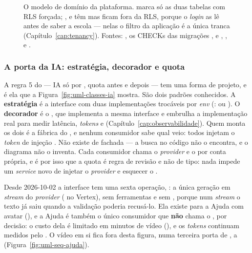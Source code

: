 \begin{figure}[H]
{\begin{tikzpicture}[x=1cm, y=1cm]
\end{tikzpicture}}
\caption[Classes: o modelo de domínio da plataforma]{O modelo de domínio da
  plataforma.  marca só as duas tabelas com RLS forçada;
  ,  e  têm  mas ficam fora da
  RLS, porque o \emph{login} as lê antes de saber a escola --- nelas o filtro da
  aplicação é a única tranca (Capítulo~\ref{cap:tenancy}). Fontes:
  , os CHECKs das migrações
  ,  e ,
  ,  e
  .}
\label{fig:uml-classes-dominio}
\end{figure}

\subsubsection{A porta da IA: estratégia, decorador e quota}

A regra 5 do  --- IA só por , quota antes e depois ---
tem uma forma de projeto, e é ela que a Figura~\ref{fig:uml-classes-ia} mostra.
São dois padrões conhecidos. A \textbf{estratégia} é a interface 
com duas implementações trocáveis por \emph{env} (: 
ou ). O \textbf{decorador} é o , que implementa a
mesma interface e embrulha a implementação real para medir latência, \emph{tokens}
e  (Capítulo~\ref{cap:observabilidade}). Quem monta os dois é a
fábrica do , e nenhum consumidor sabe qual veio: todos injetam o
\emph{token} de injeção . Não existe  de fachada
--- a busca no código não o encontra, e o diagrama não o inventa. Cada
consumidor chama o \emph{provider} e o  por conta própria, e é por
isso que a quota é regra de revisão e não de tipo: nada impede um \emph{service}
novo de injetar o \emph{provider} e esquecer o .

Desde 2026-10-02 a interface tem uma sexta operação, : a
única geração em \emph{stream} do \emph{provider} (
no Vertex), sem ferramentas e sem , porque num \emph{stream} o texto
já saiu quando a validação poderia recusá-lo. Ela existe para a Ajuda com avatar
(), e a Ajuda é também o único consumidor que \textbf{não} chama o
, por decisão: o custo dela é limitado em minutos de vídeo
(), e os \emph{tokens} continuam medidos pelo
. O vídeo em si fica fora desta figura, numa terceira
porta de , a  (Figura~\ref{fig:uml-seq-ajuda}).

